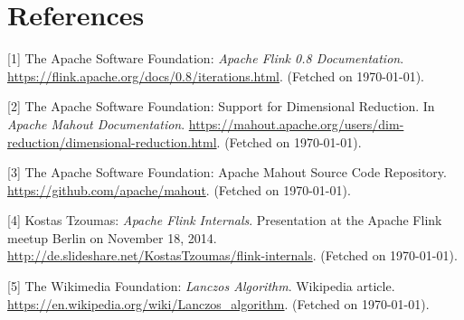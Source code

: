 \section*{References}


\small{
[1] The Apache Software Foundation: {\it Apache Flink 0.8 Documentation}. 
\url{https://flink.apache.org/docs/0.8/iterations.html}. (Fetched on \today).

[2] The Apache Software Foundation: Support for Dimensional Reduction. In
{\it Apache Mahout Documentation}.
\url{https://mahout.apache.org/users/dim-reduction/dimensional-reduction.html}.
(Fetched on \today).

[3] The Apache Software Foundation: Apache Mahout Source Code Repository.
\url{https://github.com/apache/mahout}. (Fetched on \today).

[4] Kostas Tzoumas: {\it Apache Flink Internals}. Presentation at the Apache
Flink meetup Berlin on November 18, 2014.
\url{http://de.slideshare.net/KostasTzoumas/flink-internals}. (Fetched on
\today).

[5] The Wikimedia Foundation: {\it Lanczos Algorithm}. Wikipedia article.
\url{https://en.wikipedia.org/wiki/Lanczos_algorithm}. (Fetched on \today).
}